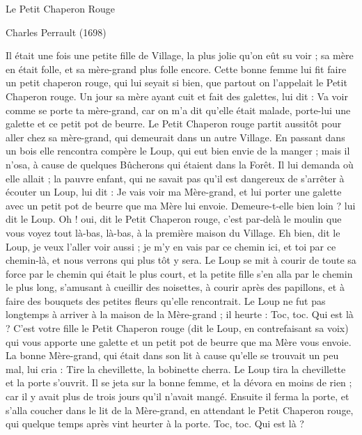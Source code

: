 \documentclass[a4paper,11pt]{article}
\begin{document}
Le Petit Chaperon Rouge

Charles Perrault (1698)

Il était une fois une petite fille de Village, la plus jolie qu'on eût su voir ; sa mère en était folle, et sa mère-grand plus folle encore. Cette bonne femme lui fit faire un petit chaperon rouge, qui lui seyait si bien, que partout on l'appelait le Petit Chaperon rouge.
Un jour sa mère ayant cuit et fait des galettes, lui dit :
Va voir comme se porte ta mère-grand, car on m'a dit qu'elle était malade, porte-lui une galette et ce petit pot de beurre. Le Petit Chaperon rouge partit aussitôt pour aller chez sa mère-grand, qui demeurait dans un autre Village. En passant dans un bois elle rencontra compère le Loup, qui eut bien envie de la manger ; mais il n'osa, à cause de quelques Bûcherons qui étaient dans la Forêt. Il lui demanda où elle allait ; la pauvre enfant, qui ne savait pas qu'il est dangereux de s'arrêter à écouter un Loup, lui dit : Je vais voir ma Mère-grand, et lui porter une galette avec un petit pot de beurre que ma Mère lui envoie.
Demeure-t-elle bien loin ? lui dit le Loup. Oh ! oui, dit le Petit Chaperon rouge, c'est par-delà le moulin que vous voyez tout là-bas, là-bas, à la première maison du Village. Eh bien, dit le Loup, je veux l'aller voir aussi ; je m'y en vais par ce chemin ici, et toi par ce chemin-là, et nous verrons qui plus tôt y sera. Le Loup se mit à courir de toute sa force par le chemin qui était le plus court, et la petite fille s'en alla par le chemin le plus long, s'amusant à cueillir des noisettes, à courir après des papillons, et à faire des bouquets des petites fleurs qu'elle rencontrait.
Le Loup ne fut pas longtemps à arriver à la maison de la Mère-grand ; il heurte :
Toc, toc. Qui est là ? C'est votre fille le Petit Chaperon rouge (dit le Loup, en contrefaisant sa voix) qui vous apporte une galette et un petit pot de beurre que ma Mère vous envoie. La bonne Mère-grand, qui était dans son lit à cause qu'elle se trouvait un peu mal, lui cria : Tire la chevillette, la bobinette cherra.
Le Loup tira la chevillette et la porte s'ouvrit. Il se jeta sur la bonne femme, et la dévora en moins de rien ; car il y avait plus de trois jours qu'il n'avait mangé. Ensuite il ferma la porte, et s'alla coucher dans le lit de la Mère-grand, en attendant le Petit Chaperon rouge, qui quelque temps après vint heurter à la porte. Toc, toc. Qui est là ?
\end{document}
